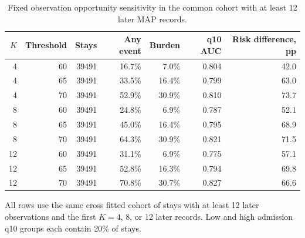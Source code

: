 \begin{table}[!htbp]
\caption{Fixed observation opportunity sensitivity in the common cohort with at least 12 later MAP records.}
\label{tab:common_cohort_fixed_opportunity_thresholds}
\centering
\scriptsize
\begin{tabular}{rrrrrrr}
\hline
$K$ & Threshold & Stays & Any event & Burden & q10 AUC & Risk difference, pp\\
\hline
4 & 60 & 39491 & 16.7\% & 7.0\% & 0.804 & 42.0\\
4 & 65 & 39491 & 33.5\% & 16.4\% & 0.799 & 63.0\\
4 & 70 & 39491 & 52.9\% & 30.9\% & 0.810 & 73.7\\
8 & 60 & 39491 & 24.8\% & 6.9\% & 0.787 & 52.1\\
8 & 65 & 39491 & 45.0\% & 16.4\% & 0.795 & 68.9\\
8 & 70 & 39491 & 64.3\% & 30.9\% & 0.821 & 71.5\\
12 & 60 & 39491 & 31.1\% & 6.9\% & 0.775 & 57.1\\
12 & 65 & 39491 & 52.8\% & 16.3\% & 0.794 & 69.8\\
12 & 70 & 39491 & 70.8\% & 30.7\% & 0.827 & 66.6\\
\hline
\end{tabular}
\par\smallskip
\footnotesize{All rows use the same cross fitted cohort of stays with at least 12 later observations and the first $K=4$, 8, or 12 later records. Low and high admission q10 groups each contain 20\% of stays.}
\end{table}
